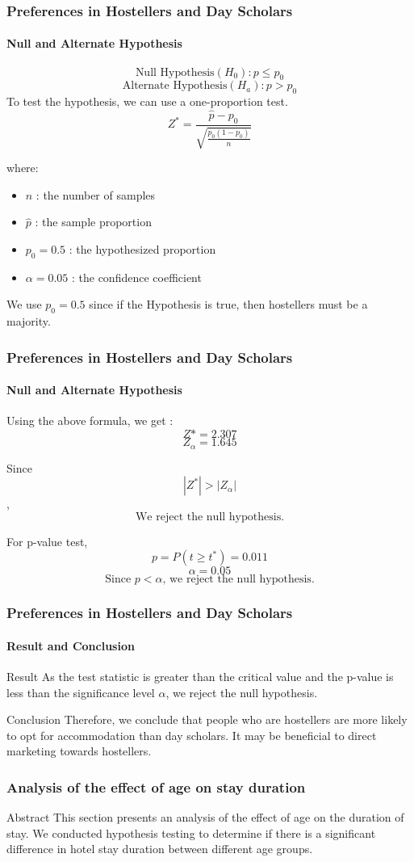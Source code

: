 \documentclass{beamer}
\begin{document}
\begin{frame}
\frametitle{Preferences in Hostellers and Day
Scholars}
\framesubtitle{Null and Alternate Hypothesis}
$$\text{Null Hypothesis}(H_0): p \le p_0 $$
$$\text{Alternate Hypothesis}(H_a): p > p_0$$  
To test the hypothesis, we can use a one-proportion test.
\[ Z^* = \frac{\hat{p} - p_0}{\sqrt{\frac{p_0(1 - p_0)}{n}}} \]

where:
\begin{itemize}
    \item $n$ : the number of samples
    \item $\hat{p}$ : the sample proportion
    \item $p_0 = 0.5$ : the hypothesized proportion
    \item $\alpha = 0.05$ :  the confidence coefficient
\end{itemize}
We use $p_0 = 0.5$ since if the Hypothesis is true, then hostellers must be a majority.
\end{frame}

\begin{frame}
\frametitle{Preferences in Hostellers and Day
Scholars}
\framesubtitle{Null and Alternate Hypothesis}
\large Using the above formula, we get :
\[ Z* = 2.307\]
\[ Z_{\alpha} = 1.645\]

Since 
\[ |Z^*| > |Z_{\alpha}|\],
\[\text{We reject the null hypothesis.}\]

For p-value test,
\[p = P(t \geq t^*) = 0.011\]
\[\alpha = 0.05\]
\[\text{Since $p < \alpha$, we reject the null hypothesis.}\]
\end{frame}

\begin{frame}
\frametitle{Preferences in Hostellers and Day
Scholars}
\framesubtitle{Result and Conclusion}
\begin{block}{Result}
As the test statistic is greater than the critical value and the p-value is less than
the significance level $\alpha$, we reject the null hypothesis.
\end{block}

\begin{block}{Conclusion}
Therefore, we conclude that people who are hostellers are more likely to opt for accommodation than day scholars. It may be beneficial to direct marketing towards hostellers.
\end{block}
\end{frame}

\begin{frame}
\frametitle{Analysis of the effect of age on
stay duration}
\begin{block}{Abstract}
This section presents an analysis of the effect of age on the duration of
stay. We conducted hypothesis testing to determine if there is a significant difference in hotel stay duration between different age groups.
\end{block}
\end{frame}
\end{document}

